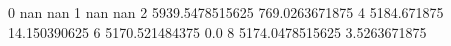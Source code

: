 0 nan nan
1 nan nan
2 5939.5478515625 769.0263671875
4 5184.671875 14.150390625
6 5170.521484375 0.0
8 5174.0478515625 3.5263671875
